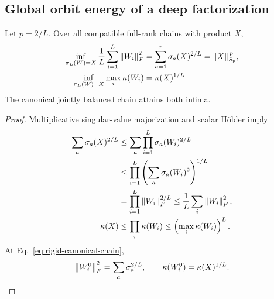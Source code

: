 \subsection{Global orbit energy of a deep factorization}
\begin{theorem}
Let $p=2/L$. Over all compatible full-rank chains with product $X$,
\begin{align}
\inf_{\pi_L(W)=X}\frac1L\sum_{i=1}^L\left\lVert W_i\right\rVert_F^2
&=\sum_{a=1}^r\sigma_a(X)^{2/L}
=\|X\|_{S_p}^{\,p},\\
\inf_{\pi_L(W)=X}\max_i\kappa(W_i)
&=\kappa(X)^{1/L}.
\label{eq:rigid-chain-orbit-energy}
\end{align}
The canonical jointly balanced chain attains both infima.
\end{theorem}
\begin{proof}
Multiplicative singular-value majorization and scalar H\"older imply
\begin{align}
\sum_a\sigma_a(X)^{2/L}
&\leq\sum_a\prod_{i=1}^L\sigma_a(W_i)^{2/L}\\
&\leq\prod_{i=1}^L
\left(\sum_a\sigma_a(W_i)^2\right)^{1/L}\\
&=\prod_{i=1}^L\left\lVert W_i\right\rVert_F^{2/L}
\leq\frac1L\sum_i\left\lVert W_i\right\rVert_F^2,\\
\kappa(X)&\leq\prod_i\kappa(W_i)
\leq\left(\max_i\kappa(W_i)\right)^L.
\end{align}
At Eq.~\eqref{eq:rigid-canonical-chain},
\begin{equation}
\left\lVert W_i^0\right\rVert_F^2=\sum_a\sigma_a^{2/L},
\qquad\kappa(W_i^0)=\kappa(X)^{1/L}.
\end{equation}
\end{proof}
